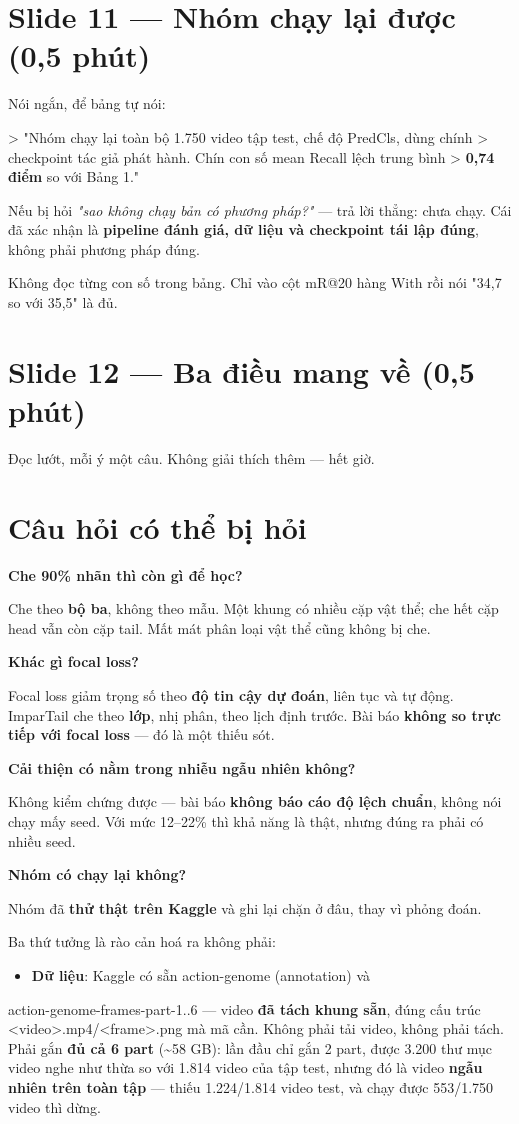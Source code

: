 \documentclass[11pt,a4paper]{article}
\newcommand{\code}[1]{{\ttfamily\small\color{codetext}#1}}
\begin{document}
\section{Slide 11 --- Nhóm chạy lại được (0,5 phút)}
Nói ngắn, để bảng tự nói:

> "Nhóm chạy lại toàn bộ 1.750 video tập test, chế độ PredCls, dùng chính > checkpoint tác giả phát hành. Chín con số mean Recall lệch trung bình > \textbf{0,74 điểm} so với Bảng 1."

Nếu bị hỏi \emph{"sao không chạy bản có phương pháp?"} --- trả lời thẳng: chưa chạy. Cái đã xác nhận là \textbf{pipeline đánh giá, dữ liệu và checkpoint tái lập đúng}, không phải phương pháp đúng.

Không đọc từng con số trong bảng. Chỉ vào cột mR@20 hàng With rồi nói "34,7 so với 35,5" là đủ.

\section{Slide 12 --- Ba điều mang về (0,5 phút)}
Đọc lướt, mỗi ý một câu. Không giải thích thêm --- hết giờ.

\section{Câu hỏi có thể bị hỏi}
\textbf{Che 90\% nhãn thì còn gì để học?}

Che theo \textbf{bộ ba}, không theo mẫu. Một khung có nhiều cặp vật thể; che hết cặp head vẫn còn cặp tail. Mất mát phân loại vật thể cũng không bị che.

\textbf{Khác gì focal loss?}

Focal loss giảm trọng số theo \textbf{độ tin cậy dự đoán}, liên tục và tự động. ImparTail che theo \textbf{lớp}, nhị phân, theo lịch định trước. Bài báo \textbf{không so trực tiếp với focal loss} --- đó là một thiếu sót.

\textbf{Cải thiện có nằm trong nhiễu ngẫu nhiên không?}

Không kiểm chứng được --- bài báo \textbf{không báo cáo độ lệch chuẩn}, không nói chạy mấy seed. Với mức 12--22\% thì khả năng là thật, nhưng đúng ra phải có nhiều seed.

\textbf{Nhóm có chạy lại không?}

Nhóm đã \textbf{thử thật trên Kaggle} và ghi lại chặn ở đâu, thay vì phỏng đoán.

Ba thứ tưởng là rào cản hoá ra không phải:

\begin{itemize}\itemsep2pt
\item \textbf{Dữ liệu}: Kaggle có sẵn \code{action-genome} (annotation) và
\end{itemize}
\code{action-genome-frames-part-1..6} --- video \textbf{đã tách khung sẵn}, đúng cấu trúc \code{<video>.mp4/<frame>.png} mà mã cần. Không phải tải video, không phải tách. Phải gắn \textbf{đủ cả 6 part} (\textasciitilde{}58 GB): lần đầu chỉ gắn 2 part, được 3.200 thư mục video nghe như thừa so với 1.814 video của tập test, nhưng đó là video \textbf{ngẫu nhiên trên toàn tập} --- thiếu 1.224/1.814 video test, và chạy được 553/1.750 video thì dừng.
\end{document}
